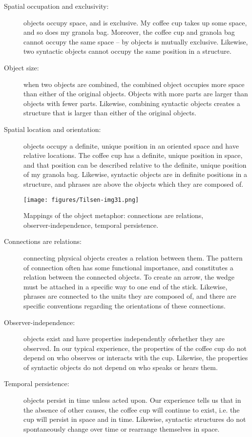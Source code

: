 \begin{description}
\item[Spatial occupation and exclusivity:] objects occupy space, and  is exclusive. My coffee cup takes up some space, and so does my granola bag. Moreover, the coffee cup and granola bag cannot occupy the same space --  by objects is mutually exclusive. Likewise, two syntactic objects cannot occupy the same position in a structure. 

\item[Object size:] when two objects are combined, the combined object occupies more space than either of the original objects. Objects with more parts are larger than objects with fewer parts. Likewise, combining syntactic objects creates a structure that is larger than either of the original objects.

\item[Spatial location and orientation:] objects occupy a definite, unique position in an oriented space and have relative locations. The coffee cup has a definite, unique position in space, and that position can be described relative to the definite, unique position of my granola bag. Likewise, syntactic objects are in definite positions in a structure, and phrases are above the objects which they are composed of.
\end{description}
  
\begin{figure}[H]
\texttt{[image: figures/Tilsen-img31.png]}
\caption{Mappings of the object metaphor: connections are relations, observer-independence, temporal persistence.}
\label{fig:3:3}
\end{figure}
 
\begin{description}
\item[Connections are relations:] connecting physical objects creates a relation between them. The pattern of connection often has some functional importance, and constitutes a relation between the connected objects. To create an arrow, the wedge must be attached in a specific way to one end of the stick. Likewise, phrases are connected to the units they are composed of, and there are specific conventions regarding the orientations of these connections.

\item[Observer-independence:] objects exist and have properties independently of\linebreak whether they are observed. In our typical experience, the properties of the coffee cup do not depend on who observes or interacts with the cup. Likewise, the properties of syntactic objects do not depend on who speaks or hears them.

\item[Temporal persistence:] objects persist in time unless acted upon. Our experience tells us that in the absence of other causes, the coffee cup will continue to exist, i.e. the cup will persist in space and in time. Likewise, syntactic structures do not spontaneously change over time or rearrange themselves in space.
\end{description}

